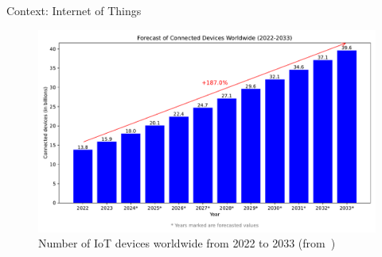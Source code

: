 \begin{frame}{Context: Internet of Things}
\begin{minipage}[c]{0.5\textwidth}
\begin{figure}
            \label{fig:iot_application}
        \end{figure}
        \vspace{-15pt}
        \begin{figure}
            \centering
            \includegraphics[width=.825\textwidth]{src/1_introduction/img/iot_forecasts.pdf}
            \vspace{-5pt}
            \caption{Number of IoT devices worldwide from 2022 to 2033 (from~\cite{statista_iot})}
            \label{fig:nbr_iot}
        \end{figure}
    \end{minipage}
\end{frame}



